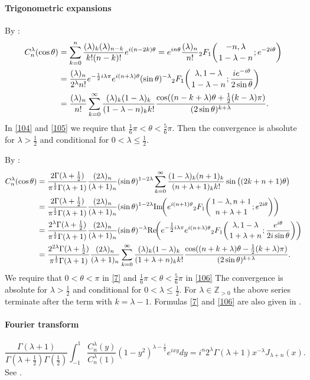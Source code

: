 \documentclass[twoside,11pt]{article}
\newcommand\ZZ{\mathbb{Z}}
\newcommand\tha\theta
\newcommand\la\lambda
\newcommand\Ga{\Gamma}
\newcommand\half{\frac12}
\newcommand\thalf{\tfrac12}
\newcommand\iy\infty
\newcommand\Zpos{\ZZ_{>0}}
\newcommand{\hyp}[5]{ \mbox{}_{#1}F_{#2}\!\left(
  \genfrac{}{}{0pt}{}{#3}{#4};#5\right)}
\renewcommand\Re{{\rm Re} }
\renewcommand\Im{{\rm Im} }
\begin{document}
\paragraph{Trigonometric expansions}
By :
\begin{align}
C_n^{\la}(\cos\tha)
&=\sum_{k=0}^n\frac{(\la)_k(\la)_{n-k}}{k! (n-k)!} e^{i(n-2k)\tha}
=e^{in\tha}\frac{(\la)_n}{n!} 
\hyp21{-n,\la}{1-\la-n}{e^{-2i\tha}}\label{103}\\
&=\frac{(\la)_n}{2^\la n!} 
e^{-\half i\la\pi}e^{i(n+\la)\tha} (\sin\tha)^{-\la} 
\hyp21{\la,1-\la}{1-\la-n}{\frac{i e^{-i\tha}}{2\sin\tha}}\label{104}\\
&=\frac{(\la)_n}{n!} \sum_{k=0}^\iy\frac{(\la)_k(1-\la)_k}{(1-\la-n)_k k!} 
\frac{\cos((n-k+\la)\tha+\thalf(k-\la)\pi)}{(2\sin\tha)^{k+\la}} .\label{105}
\end{align}
In \eqref{104} and \eqref{105} we require that
$\tfrac16\pi<\tha<\tfrac56\pi$. Then the convergence is absolute for $\la>\thalf$
and conditional for $0<\la\le\thalf$.

By \mycite{DLMF}{(14.13.1), (14.3.21), (15.8.1)]}:
\begin{align}
C_n^\la(\cos\tha)&=\frac{2\Ga(\la+\thalf)}{\pi^\half\Ga(\la+1)} 
\frac{(2\la)_n}{(\la+1)_n} (\sin\tha)^{1-2\la} 
\sum_{k=0}^\iy\frac{(1-\la)_k(n+1)_k}{(n+\la+1)_k k!} 
\sin\big((2k+n+1)\tha\big)
\label{7}\\
&=\frac{2\Ga(\la+\thalf)}{\pi^\half\Ga(\la+1)} 
\frac{(2\la)_n}{(\la+1)_n} (\sin\tha)^{1-2\la} 
\Im\!\!\left(e^{i(n+1)\tha} \hyp21{1-\la,n+1}{n+\la+1}{e^{2i\tha}}\right)\nonumber\\
&=\frac{2^\la\Ga(\la+\thalf)}{\pi^\half\Ga(\la+1)} 
\frac{(2\la)_n}{(\la+1)_n} (\sin\tha)^{-\la} 
\Re\!\!\left(e^{-\thalf i\la\pi}e^{i(n+\la)\tha} 
\hyp21{\la,1-\la}{1+\la+n}{\frac{e^{i\tha}}{2i\sin\tha}}\right)\nonumber\\
&=\frac{2^{2\la}\Ga(\la+\thalf)}{\pi^\half\Ga(\la+1)} \frac{(2\la)_n}{(\la+1)_n} 
\sum_{k=0}^\iy\frac{(\la)_k(1-\la)_k}{(1+\la+n)_k k!} 
\frac{\cos((n+k+\la)\tha-\thalf(k+\la)\pi)}{(2\sin\tha)^{k+\la}} .
\label{106}
\end{align}
We require that $0<\tha<\pi$ in \eqref{7} and $\tfrac16\pi<\tha<\tfrac56\pi$ in
\eqref{106} The convergence is absolute for $\la>\thalf$ and conditional for
$0<\la\le\thalf$.
For $\la\in\Zpos$ the above series terminate after the term with
$k=\la-1$.
Formulas \eqref{7} and \eqref{106} are also given in
.
%
\paragraph{Fourier transform}
\begin{equation}
\frac{\Ga(\la+1)}{\Ga(\la+\thalf) \Ga(\thalf)} 
\int_{-1}^1 \frac{C_n^\la(y)}{C_n^\la(1)} (1-y^2)^{\la-\half} 
e^{ixy} dy
=i^n 2^\la \Ga(\la+1) x^{-\la} J_{\la+n}(x).
\label{8}
\end{equation}
See .
%
\end{document}
